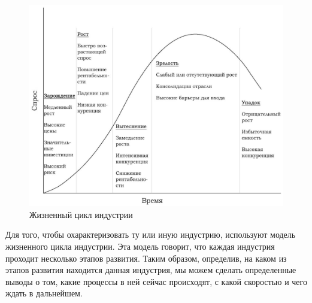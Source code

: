 \documentclass{article}
\begin{document}
	\begin{figure}[h]
		\centering
		\includegraphics[scale = 0.35]{life_cycle_industry.jpg}
		\caption{Жизненный цикл индустрии}
		\label{model}
	\end{figure}
	Для того, чтобы охарактеризовать ту или иную индустрию, используют модель жизненного цикла индустрии. 
	Эта модель говорит, что каждая индустрия проходит несколько этапов развития. Таким образом, определив, на каком из этапов развития находится данная индустрия, мы можем сделать определенные выводы о том, какие процессы в ней сейчас происходят, с какой скоростью и чего ждать в дальнейшем.
	
\end{document}

